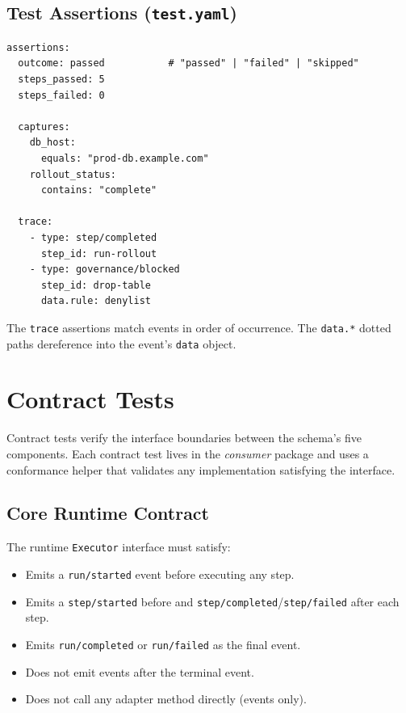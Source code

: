 \subsection{Test Assertions (\texttt{test.yaml})}

\begin{verbatim}
assertions:
  outcome: passed           # "passed" | "failed" | "skipped"
  steps_passed: 5
  steps_failed: 0

  captures:
    db_host:
      equals: "prod-db.example.com"
    rollout_status:
      contains: "complete"

  trace:
    - type: step/completed
      step_id: run-rollout
    - type: governance/blocked
      step_id: drop-table
      data.rule: denylist
\end{verbatim}

The \texttt{trace} assertions match events in order of occurrence. The \texttt{data.*} dotted paths dereference into the event's \texttt{data} object.

\section{Contract Tests}

Contract tests verify the interface boundaries between the schema's five components. Each contract test lives in the \emph{consumer} package and uses a conformance helper that validates any implementation satisfying the interface.

\subsection{Core Runtime Contract}

The runtime \texttt{Executor} interface must satisfy:

\begin{itemize}
  \item Emits a \texttt{run/started} event before executing any step.
  \item Emits a \texttt{step/started} before and \texttt{step/completed}/\texttt{step/failed} after each step.
  \item Emits \texttt{run/completed} or \texttt{run/failed} as the final event.
  \item Does not emit events after the terminal event.
  \item Does not call any adapter method directly (events only).
\end{itemize}

